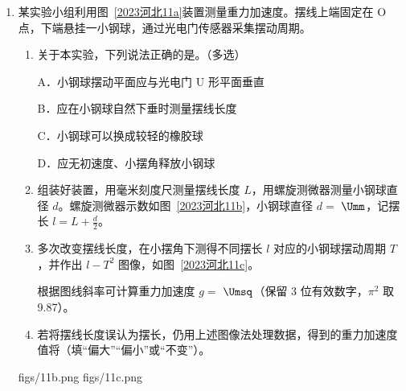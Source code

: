 \documentclass[\gkver]{gaokaozhenti}
\begin{document}
\begin{enumerate}
{B．取无穷远处为零电势点，由于正点电荷周围的电势为正值，若在 O 点放一正点电荷，则 A、B 两点的电势一定升高，故 B 正确；

C．试探电荷 $q$ 沿 $y$ 轴运动过程中，根据电荷分布，若静电力始终不做功，则经过 $y$ 轴且垂直于 $x$ 轴的平面为等势面，但静电力不一定为零，故 C 错误；

D．根据以 O 点为球心、以 OC 为半径的球面为等势面，可知 C 点的电场强度方向应与 $y$ 轴重合，再根据经过 $y$ 轴且垂直于 $x$ 轴的平面为等势面，可知 C 点的电场强度方向应与 $y$ 轴垂直，同一点电场强度的方向是唯一的，故 C 点的电场强度一定为零，故 D 正确。

故选 BD。
}

\item
某实验小组利用图~\ref{2023河北11a}装置测量重力加速度。摆线上端固定在 O 点，下端悬挂一小钢球，通过光电门传感器采集摆动周期。
\begin{enumerate}
	\item
	关于本实验，下列说法正确的是。（多选）

	A．小钢球摆动平面应与光电门 U 形平面垂直

	B．应在小钢球自然下垂时测量摆线长度

	C．小钢球可以换成较轻的橡胶球

	D．应无初速度、小摆角释放小钢球

	\item
	组装好装置，用毫米刻度尺测量摆线长度 $L$，用螺旋测微器测量小钢球直径 $d$。螺旋测微器示数如图~\ref{2023河北11b}，小钢球直径 $d=$ $\Umm$，记摆长 $l=L+\frac{d}{2}$。

	\item
	多次改变摆线长度，在小摆角下测得不同摆长 $l$ 对应的小钢球摆动周期 $T$，并作出 $l-T^{2}$ 图像，如图~\ref{2023河北11c}。

	根据图线斜率可计算重力加速度 $g=$ $\Umsq$（保留 3 位有效数字，$\pi^{2}$ 取 9.87）。

	\item
	若将摆线长度误认为摆长，仍用上述图像法处理数据，得到的重力加速度值将（填“偏大”“偏小”或“不变”）。
\end{enumerate}

{figs/11b.png}
{figs/11c.png}


\end{enumerate}
\end{document}
